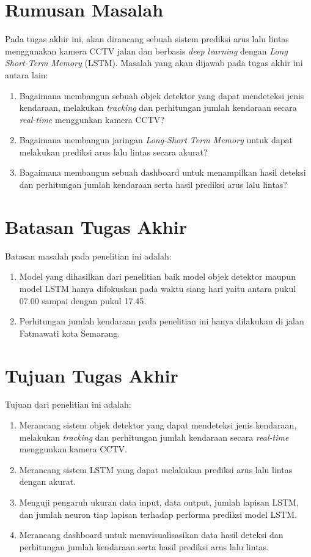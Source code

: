 \documentclass[../thesis.tex]{subfiles}
\begin{document}
\section{Rumusan Masalah}

Pada tugas akhir ini, akan dirancang sebuah sistem prediksi arus lalu lintas menggunakan kamera CCTV jalan dan berbasis \textit{deep learning} dengan \textit{Long Short-Term Memory} (LSTM). Masalah yang akan dijawab pada tugas akhir ini antara lain:
\begin{enumerate}
\item Bagaimana membangun sebuah objek detektor yang dapat mendeteksi jenis kendaraan, melakukan \textit{tracking} dan perhitungan jumlah kendaraan secara \textit{real-time} menggunkan kamera CCTV?
\item Bagaimana membangun jaringan \textit{Long-Short Term Memory} untuk dapat melakukan prediksi arus lalu lintas secara akurat?
\item Bagaimana membangun sebuah dashboard untuk menampilkan hasil deteksi dan perhitungan jumlah kendaraan serta hasil prediksi arus lalu lintas?
\end{enumerate}

\section{Batasan Tugas Akhir}
Batasan masalah pada penelitian ini adalah:
\begin{enumerate}
    \item Model yang dihasilkan dari penelitian baik model objek detektor maupun model LSTM hanya difokuskan pada waktu siang hari yaitu antara pukul 07.00 sampai dengan pukul 17.45.
    \item Perhitungan jumlah kendaraan pada penelitian ini hanya dilakukan di jalan Fatmawati kota Semarang.
\end{enumerate}

\section{Tujuan Tugas Akhir}
Tujuan dari penelitian ini adalah:
\begin{enumerate}
    \item Merancang sistem objek detektor yang dapat mendeteksi jenis kendaraan, melakukan \textit{tracking} dan perhitungan jumlah kendaraan secara \textit{real-time} menggunkan kamera CCTV.
    \item Merancang sistem LSTM yang dapat melakukan prediksi arus lalu lintas dengan akurat.
    \item Menguji pengaruh ukuran data input, data output, jumlah lapisan LSTM, dan jumlah neuron tiap lapisan terhadap performa prediksi model LSTM.
    \item Merancang dashboard untuk memvisualisasikan data hasil deteksi dan perhitungan jumlah kendaraan serta hasil prediksi arus lalu lintas.
\end{enumerate}
\end{document}
